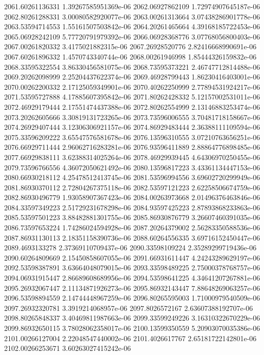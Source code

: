 {2061.60261136331 1.39267585951369e-06
2062.06927862109 1.72974907645187e-06
2062.80261288331 3.00080582920077e-06
2063.00261313664 3.07438286901778e-06
2063.53594714553 1.55161507503842e-06
2064.20261465664 4.39168185722453e-06
2065.06928242109 5.77720791979392e-06
2066.06928368776 3.07768056800403e-06
2067.00261820332 3.4175021882315e-06
2067.26928520776 2.82416668990691e-06
2067.60261896332 1.4570743340744e-06
2068.00261946998 1.85444326159832e-06
2068.33595322554 3.86330456581075e-06
2068.73595373221 2.46747712814488e-06
2069.20262098999 2.25204437622374e-06
2069.46928799443 1.86230416403001e-06
2070.00262200332 2.17125059349901e-06
2070.40262250999 2.77894531924217e-06
2071.53595727888 4.17885607395842e-06
2071.80262428332 5.12157002531011e-06
2072.46929179444 2.17551474437388e-06
2072.80262554999 2.13146883253474e-06
2073.20262605666 3.30819131723265e-06
2073.73596006555 3.70481718158667e-06
2074.26929407444 3.12306306921157e-06
2074.86929483444 2.36388111109594e-06
2075.33596209222 3.65547576581678e-06
2076.13596310555 3.07210763656251e-06
2076.66929711444 2.96062716283281e-06
2076.93596411889 2.88864776898485e-06
2077.66929838111 3.62388314025264e-06
2078.46929939445 4.64306970250455e-06
2079.73596766556 4.36072050621492e-06
2080.13596817223 3.43361134447153e-06
2080.66930218112 4.25478512413745e-06
2081.53596994556 3.69602720299949e-06
2081.86930370112 2.72804267375118e-06
2082.53597121223 2.62258506674759e-06
2082.86930496779 1.93058907367423e-06
2084.00263973668 2.01496376463846e-06
2084.33597349223 2.51729231678298e-06
2084.93597425223 2.87893868233863e-06
2085.53597501223 3.88482881301755e-06
2085.86930876779 3.26607460391035e-06
2086.73597653224 1.74286024594928e-06
2087.20264379002 2.56283350588536e-06
2087.86931130113 2.18351158390736e-06
2088.60264556335 3.69716152450447e-06
2089.4693133278 2.37369110709437e-06
2090.33598109224 2.35289299719436e-06
2090.60264809669 2.15450858607055e-06
2091.66931611447 4.24243289629197e-06
2092.53598387891 3.63664048079015e-06
2093.33598489225 2.75000378768757e-06
2094.06931915447 2.86689608689956e-06
2094.53598641225 4.34641207267881e-06
2095.26932067447 2.11134871926273e-06
2095.86932143447 7.88648269063257e-06
2096.53598894559 2.14744448967259e-06
2096.80265595003 1.71000979540509e-06
2097.26932320781 3.3919214068957e-06
2097.8026572167 2.63607388192707e-06
2098.80265848337 3.40469811987663e-06
2099.33599249226 3.16310322670229e-06
2099.86932650115 3.78028062358017e-06
2100.13599350559 5.20903070035386e-06
2101.00266127004 2.22048547440002e-06
2101.4026617767 2.65181722142801e-06
2102.00266253671 3.60263027415242e-06
}
